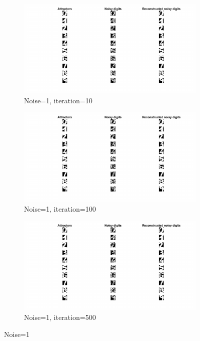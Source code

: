 \documentclass{article}
\begin{document}
\begin{figure}[h!]
     \centering
     \begin{subfigure}[b]{0.3\textwidth}
         \centering
         \includegraphics[width=\textwidth]{lab2/noise1ite10.pdf}
         \caption{Noise=1, iteration=10}
         \label{fig:noise1ite10}
     \end{subfigure}
     \hfill
     \begin{subfigure}[b]{0.3\textwidth}
         \centering
         \includegraphics[width=\textwidth]{lab2/noise1ite100.pdf}
         \caption{Noise=1, iteration=100}
         \label{fig:noise1ite100}
     \end{subfigure}
     \hfill
     \begin{subfigure}[b]{0.3\textwidth}
         \centering
         \includegraphics[width=\textwidth]{lab2/noise1ite500.pdf}
         \caption{Noise=1, iteration=500}
         \label{fig:noise1ite500}
     \end{subfigure}
        \caption{Noise=1}
        \label{fig:hopnoise1}
\end{figure}
\end{document}
